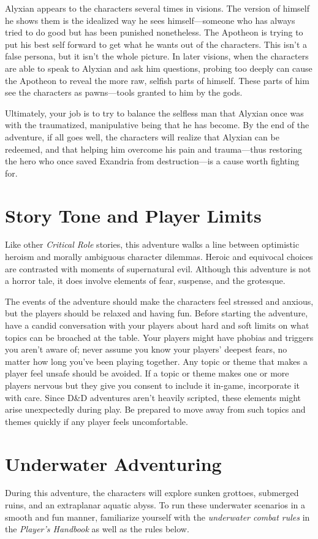 \documentclass[10pt,a4paper,twoside,fancy,bg=print,twocolumn,openany,nodeprecatedcode]{dndbook}
\begin{document}
Alyxian appears to the characters several times in visions. The version of himself he shows them is the idealized way he sees himself—someone who has always tried to do good but has been punished nonetheless. The Apotheon is trying to put his best self forward to get what he wants out of the characters. This isn't a false persona, but it isn't the whole picture. In later visions, when the characters are able to speak to Alyxian and ask him questions, probing too deeply can cause the Apotheon to reveal the more raw, selfish parts of himself. These parts of him see the characters as pawns—tools granted to him by the gods.

Ultimately, your job is to try to balance the selfless man that Alyxian once was with the traumatized, manipulative being that he has become. By the end of the adventure, if all goes well, the characters will realize that Alyxian can be redeemed, and that helping him overcome his pain and trauma—thus restoring the hero who once saved Exandria from destruction—is a cause worth fighting for.

\section{Story Tone and Player Limits}
Like other \textit{Critical Role} stories, this adventure walks a line between optimistic heroism and morally ambiguous character dilemmas. Heroic and equivocal choices are contrasted with moments of supernatural evil. Although this adventure is not a horror tale, it does involve elements of fear, suspense, and the grotesque.

The events of the adventure should make the characters feel stressed and anxious, but the players should be relaxed and having fun. Before starting the adventure, have a candid conversation with your players about hard and soft limits on what topics can be broached at the table. Your players might have phobias and triggers you aren't aware of; never assume you know your players' deepest fears, no matter how long you've been playing together. Any topic or theme that makes a player feel unsafe should be avoided. If a topic or theme makes one or more players nervous but they give you consent to include it in-game, incorporate it with care. Since D\&D adventures aren't heavily scripted, these elements might arise unexpectedly during play. Be prepared to move away from such topics and themes quickly if any player feels uncomfortable.

\section{Underwater Adventuring}
During this adventure, the characters will explore sunken grottoes, submerged ruins, and an extraplanar aquatic abyss. To run these underwater scenarios in a smooth and fun manner, familiarize yourself with the \textit{underwater combat rules} in the \textit{Player's Handbook} as well as the rules below.
\end{document}
